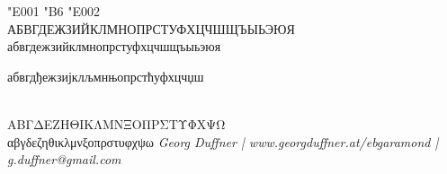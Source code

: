 \documentclass[pagesize,DIV14]{scrartcl}
\begin{document}
\begin{center}
{\Huge \char"E001 \char"B6 \char"E002}\\
АБВГДЕЖЗИЙКЛМНОПРСТУФХЦЧШЩЪЫЬЭЮЯ\\
абвгдежзийклмнопрстуфхцчшщъыьэюя\\
\begin{serbian}{
абвгдђежзијклљмнњопрстћуфхцчџш}\end{serbian}\\
ΑΒΓΔΕΖΗΘΙΚΛΜΝΞΟΠΡΣΤΥΦΧΨΩ\\
αβγδεζηθικλμνξοπρστυφχψω
\vfill
\fontsize{12}{12}\scriptsize\textit{{Georg Duffner} | www.georgduffner.at/ebgaramond | g.duffner@gmail.com}
\end{center}
\end{document}
